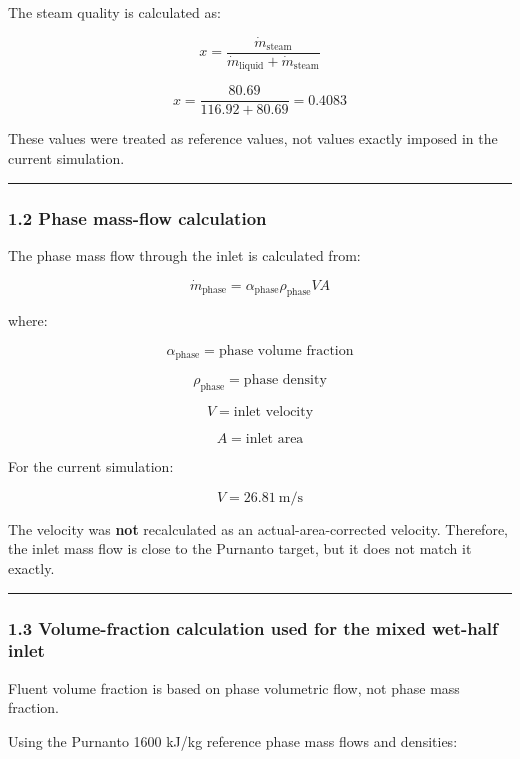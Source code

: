 \documentclass[
  11pt,
]{article}
\begin{document}
The steam quality is calculated as:

\[
x = \frac{\dot{m}_{\text{steam}}}
{\dot{m}_{\text{liquid}} + \dot{m}_{\text{steam}}}
\]

\[
x = \frac{80.69}{116.92 + 80.69}
= 0.4083
\]

These values were treated as reference values, not values exactly
imposed in the current simulation.

\begin{center}\rule{0.5\linewidth}{0.5pt}\end{center}

\subsubsection{1.2 Phase mass-flow
calculation}\label{phase-mass-flow-calculation}

The phase mass flow through the inlet is calculated from:

\[
\dot{m}_{\text{phase}}
=
\alpha_{\text{phase}}
\rho_{\text{phase}}
V A
\]

where:

\[
\alpha_{\text{phase}} = \text{phase volume fraction}
\]

\[
\rho_{\text{phase}} = \text{phase density}
\]

\[
V = \text{inlet velocity}
\]

\[
A = \text{inlet area}
\]

For the current simulation:

\[
V = 26.81\ \text{m/s}
\]

The velocity was \textbf{not} recalculated as an actual-area-corrected
velocity. Therefore, the inlet mass flow is close to the Purnanto
target, but it does not match it exactly.

\begin{center}\rule{0.5\linewidth}{0.5pt}\end{center}

\subsubsection{1.3 Volume-fraction calculation used for the mixed
wet-half
inlet}\label{volume-fraction-calculation-used-for-the-mixed-wet-half-inlet}

Fluent volume fraction is based on phase volumetric flow, not phase mass
fraction.

Using the Purnanto 1600 kJ/kg reference phase mass flows and densities:
\end{document}
